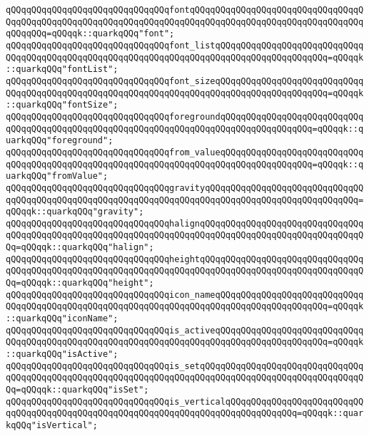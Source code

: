 \verb|qQQqqQQqqQQqqQQqqQQqqQQqqQQqqQQqfontqQQqqQQqqQQqqQQqqQQqqQQqqQQqqQQqqQQqqQQqqQQqqQQqqQQqqQQqqQQqqQQqqQQqqQQqqQQqqQQqqQQqqQQqqQQqqQQqqQQqqQQqqQQqqQQq=qQQqqk::quarkqQQq"font";|\newline
\verb|qQQqqQQqqQQqqQQqqQQqqQQqqQQqqQQqfont_listqQQqqQQqqQQqqQQqqQQqqQQqqQQqqQQqqQQqqQQqqQQqqQQqqQQqqQQqqQQqqQQqqQQqqQQqqQQqqQQqqQQqqQQqqQQq=qQQqqk::quarkqQQq"fontList";|\newline
\verb|qQQqqQQqqQQqqQQqqQQqqQQqqQQqqQQqfont_sizeqQQqqQQqqQQqqQQqqQQqqQQqqQQqqQQqqQQqqQQqqQQqqQQqqQQqqQQqqQQqqQQqqQQqqQQqqQQqqQQqqQQqqQQqqQQq=qQQqqk::quarkqQQq"fontSize";|\newline
\verb|qQQqqQQqqQQqqQQqqQQqqQQqqQQqqQQqforegroundqQQqqQQqqQQqqQQqqQQqqQQqqQQqqQQqqQQqqQQqqQQqqQQqqQQqqQQqqQQqqQQqqQQqqQQqqQQqqQQqqQQqqQQq=qQQqqk::quarkqQQq"foreground";|\newline
\verb|qQQqqQQqqQQqqQQqqQQqqQQqqQQqqQQqfrom_valueqQQqqQQqqQQqqQQqqQQqqQQqqQQqqQQqqQQqqQQqqQQqqQQqqQQqqQQqqQQqqQQqqQQqqQQqqQQqqQQqqQQqqQQq=qQQqqk::quarkqQQq"fromValue";|\newline
\verb|qQQqqQQqqQQqqQQqqQQqqQQqqQQqqQQqgravityqQQqqQQqqQQqqQQqqQQqqQQqqQQqqQQqqQQqqQQqqQQqqQQqqQQqqQQqqQQqqQQqqQQqqQQqqQQqqQQqqQQqqQQqqQQqqQQqqQQq=qQQqqk::quarkqQQq"gravity";|\newline
\verb|qQQqqQQqqQQqqQQqqQQqqQQqqQQqqQQqhalignqQQqqQQqqQQqqQQqqQQqqQQqqQQqqQQqqQQqqQQqqQQqqQQqqQQqqQQqqQQqqQQqqQQqqQQqqQQqqQQqqQQqqQQqqQQqqQQqqQQqqQQq=qQQqqk::quarkqQQq"halign";|\newline
\verb|qQQqqQQqqQQqqQQqqQQqqQQqqQQqqQQqheightqQQqqQQqqQQqqQQqqQQqqQQqqQQqqQQqqQQqqQQqqQQqqQQqqQQqqQQqqQQqqQQqqQQqqQQqqQQqqQQqqQQqqQQqqQQqqQQqqQQqqQQq=qQQqqk::quarkqQQq"height";|\newline
\verb|qQQqqQQqqQQqqQQqqQQqqQQqqQQqqQQqicon_nameqQQqqQQqqQQqqQQqqQQqqQQqqQQqqQQqqQQqqQQqqQQqqQQqqQQqqQQqqQQqqQQqqQQqqQQqqQQqqQQqqQQqqQQqqQQq=qQQqqk::quarkqQQq"iconName";|\newline
\verb|qQQqqQQqqQQqqQQqqQQqqQQqqQQqqQQqis_activeqQQqqQQqqQQqqQQqqQQqqQQqqQQqqQQqqQQqqQQqqQQqqQQqqQQqqQQqqQQqqQQqqQQqqQQqqQQqqQQqqQQqqQQqqQQq=qQQqqk::quarkqQQq"isActive";|\newline
\verb|qQQqqQQqqQQqqQQqqQQqqQQqqQQqqQQqis_setqQQqqQQqqQQqqQQqqQQqqQQqqQQqqQQqqQQqqQQqqQQqqQQqqQQqqQQqqQQqqQQqqQQqqQQqqQQqqQQqqQQqqQQqqQQqqQQqqQQqqQQq=qQQqqk::quarkqQQq"isSet";|\newline
\verb|qQQqqQQqqQQqqQQqqQQqqQQqqQQqqQQqis_verticalqQQqqQQqqQQqqQQqqQQqqQQqqQQqqQQqqQQqqQQqqQQqqQQqqQQqqQQqqQQqqQQqqQQqqQQqqQQqqQQqqQQq=qQQqqk::quarkqQQq"isVertical";|\newline
